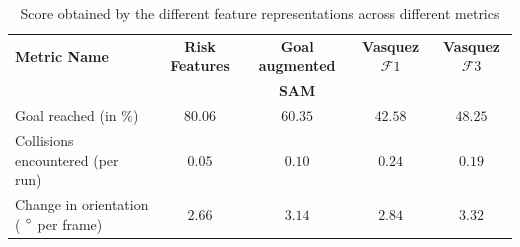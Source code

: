 \begin{table}[htbp]
	\begin{center}
		\renewcommand{\arraystretch}{1.3}
		\begin{tabular}{|p{2.5cm}|c|c|c|c|}
			\hline
			\textbf{Metric Name} & \textbf{Risk Features} & \textbf{Goal augmented}  & \textbf{Vasquez $\mathcal{F}1$}  & \textbf{Vasquez $\mathcal{F}3$} \\
			&   & \textbf{SAM}  & &  \\
			\hline
			Goal reached (in $\%$) & $80.06$ & $60.35$ & $42.58$ & $48.25$ \\
			Collisions encountered (per run) & $0.05$ & $0.10$ & $ 0.24$ & $0.19$ \\
			Change in orientation ( $\degree$ per frame) & $2.66$ & $3.14$ &  $2.84$ & $3.32$\\ %
			\hline
		\end{tabular}
	\end{center}
	\caption{Score obtained by the different feature representations across different metrics}
	\label{tab:inter_irl_numerical_results_zara02}
\end{table}



